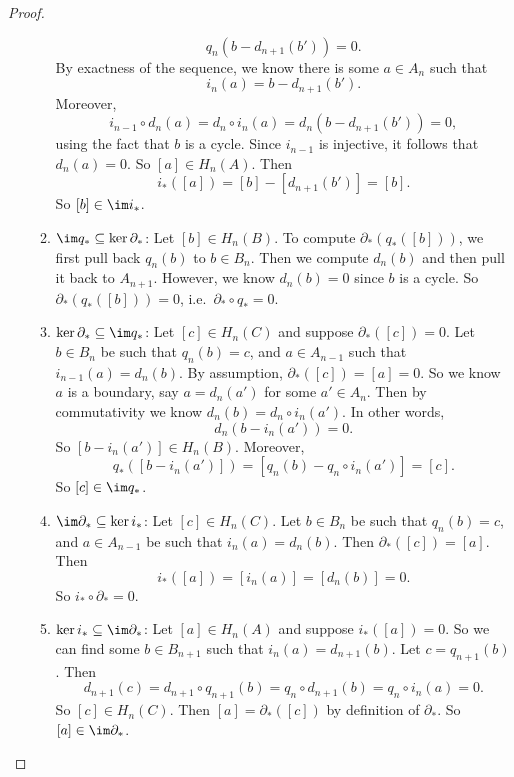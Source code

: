 \documentclass[a4paper]{article}
\theoremstyle{definition}
\begin{document}
\begin{proof}
\begin{enumerate}
\begin{enumerate}
          \[
            q_n (b - d_{n + 1}(b')) = 0.
          \]
          By exactness of the sequence, we know there is some $a \in A_n$ such that
          \[
            i_n(a) = b - d_{n + 1}(b').
          \]
          Moreover,
          \[
            i_{n - 1} \circ d_n(a) = d_n \circ i_n (a) = d_n(b - d_{n + 1}(b')) = 0,
          \]
          using the fact that $b$ is a cycle. Since $i_{n - 1}$ is injective, it follows that $d_n(a) = 0$. So $[a] \in H_n(A)$. Then
          \[
            i_*([a]) = [b] - [d_{n + 1}(b')] = [b].
          \]
          So $[b] \in \im i_*$.
        \item $\im q_* \subseteq \ker \partial_*$: Let $[b] \in H_n(B)$. To compute $\partial_*(q_*([b]))$, we first pull back $q_n(b)$ to $b \in B_n$. Then we compute $d_n(b)$ and then pull it back to $A_{n + 1}$. However, we know $d_n(b) = 0$ since $b$ is a cycle. So $\partial_*(q_*([b])) = 0$, i.e.\ $\partial_* \circ q_* = 0$.
        \item $\ker \partial_* \subseteq \im q_*$: Let $[c] \in H_n(C)$ and suppose $\partial_*([c]) = 0$. Let $b \in B_n$ be such that $q_n(b) = c$, and $a \in A_{n - 1}$ such that $i_{n - 1}(a) = d_n(b)$. By assumption, $\partial_*([c]) = [a] = 0$. So we know $a$ is a boundary, say $a = d_n (a')$ for some $a' \in A_n$. Then by commutativity we know $d_n(b) = d_n \circ i_n (a')$. In other words,
          \[
            d_n(b - i_n(a')) = 0.
          \]
          So $[b - i_n(a')] \in H_n(B)$. Moreover,
          \[
            q_*([b - i_n(a')]) = [q_n(b) - q_n \circ i_n(a')] = [c].
          \]
          So $[c] \in \im q_*$.
        \item $\im \partial_* \subseteq \ker i_*$: Let $[c] \in H_n(C)$. Let $b \in B_n$ be such that $q_n(b) = c$, and $a \in A_{n - 1}$ be such that $i_n(a) = d_n(b)$. Then $\partial_*([c]) = [a]$. Then
          \[
            i_*([a]) = [i_n(a)] = [d_n(b)] = 0.
          \]
          So $i_* \circ \partial_* = 0$.
        \item $\ker i_* \subseteq \im \partial_*$: Let $[a] \in H_n(A)$ and suppose $i_*([a]) = 0$. So we can find some $b \in B_{n + 1}$ such that $i_n(a) = d_{n + 1}(b)$. Let $c = q_{n + 1}(b)$. Then
          \[
            d_{n + 1}(c) = d_{n + 1}\circ q_{n + 1} (b) = q_n \circ d_{n + 1}(b) = q_n \circ i_n (a) = 0.
          \]
          So $[c] \in H_n(C)$. Then $[a] = \partial_*([c])$ by definition of $\partial_*$. So $[a] \in \im \partial_*$.
      \end{enumerate}
  \end{enumerate}
\end{proof}
\end{document}
